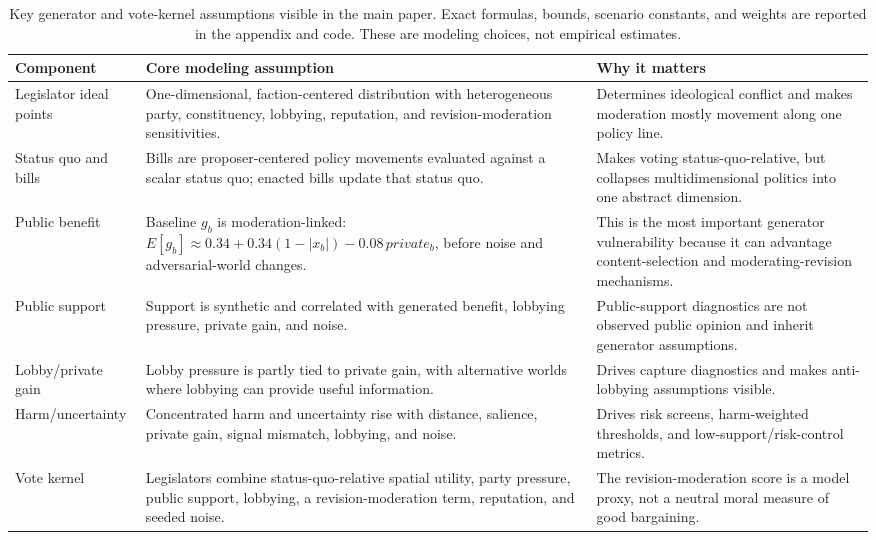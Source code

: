 \documentclass[manuscript]{acmart}
\begin{document}
\begin{table}
  \caption{Key generator and vote-kernel assumptions visible in the main paper. Exact formulas, bounds, scenario constants, and weights are reported in the appendix and code. These are modeling choices, not empirical estimates.}
  \label{tab:model-assumptions}
  \small
  \begin{tabular}{p{}p{}p{}}
    \toprule
    Component & Core modeling assumption & Why it matters \\
    \midrule
    Legislator ideal points & One-dimensional, faction-centered distribution with heterogeneous party, constituency, lobbying, reputation, and revision-moderation sensitivities. & Determines ideological conflict and makes moderation mostly movement along one policy line. \\
    Status quo and bills & Bills are proposer-centered policy movements evaluated against a scalar status quo; enacted bills update that status quo. & Makes voting status-quo-relative, but collapses multidimensional politics into one abstract dimension. \\
    Public benefit & Baseline \(g_b\) is moderation-linked: \(E[g_b]\approx0.34+0.34(1-|x_b|)-0.08\,private_b\), before noise and adversarial-world changes. & This is the most important generator vulnerability because it can advantage content-selection and moderating-revision mechanisms. \\
    Public support & Support is synthetic and correlated with generated benefit, lobbying pressure, private gain, and noise. & Public-support diagnostics are not observed public opinion and inherit generator assumptions. \\
    Lobby/private gain & Lobby pressure is partly tied to private gain, with alternative worlds where lobbying can provide useful information. & Drives capture diagnostics and makes anti-lobbying assumptions visible. \\
    Harm/uncertainty & Concentrated harm and uncertainty rise with distance, salience, private gain, signal mismatch, lobbying, and noise. & Drives risk screens, harm-weighted thresholds, and low-support/risk-control metrics. \\
    Vote kernel & Legislators combine status-quo-relative spatial utility, party pressure, public support, lobbying, a revision-moderation term, reputation, and seeded noise. & The revision-moderation score is a model proxy, not a neutral moral measure of good bargaining. \\
    \bottomrule
  \end{tabular}
\end{table}
\end{document}
